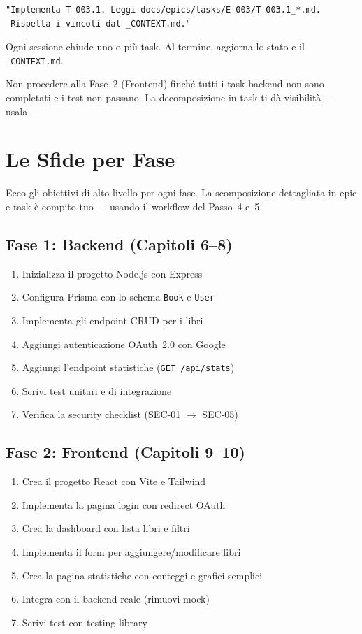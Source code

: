 \begin{lstlisting}[language={}]
"Implementa T-003.1. Leggi docs/epics/tasks/E-003/T-003.1_*.md.
 Rispetta i vincoli dal _CONTEXT.md."
\end{lstlisting}

Ogni sessione chiude uno o più task. Al termine, aggiorna lo stato e il \texttt{\_CONTEXT.md}.

\begin{tipbox}
Non procedere alla Fase~2 (Frontend) finché tutti i task backend non sono completati e i test non passano. La decomposizione in task ti dà visibilità --- usala.
\end{tipbox}

\section{Le Sfide per Fase}

Ecco gli obiettivi di alto livello per ogni fase. La scomposizione dettagliata in epic e task è compito tuo --- usando il workflow del Passo~4 e~5.

\subsection{Fase 1: Backend (Capitoli 6--8)}

\begin{enumerate}
  \item Inizializza il progetto Node.js con Express
  \item Configura Prisma con lo schema \texttt{Book} e \texttt{User}
  \item Implementa gli endpoint CRUD per i libri
  \item Aggiungi autenticazione OAuth~2.0 con Google
  \item Aggiungi l'endpoint statistiche (\texttt{GET /api/stats})
  \item Scrivi test unitari e di integrazione
  \item Verifica la security checklist (SEC-01 $\rightarrow$ SEC-05)
\end{enumerate}

\subsection{Fase 2: Frontend (Capitoli 9--10)}

\begin{enumerate}
  \item Crea il progetto React con Vite e Tailwind
  \item Implementa la pagina login con redirect OAuth
  \item Crea la dashboard con lista libri e filtri
  \item Implementa il form per aggiungere/modificare libri
  \item Crea la pagina statistiche con conteggi e grafici semplici
  \item Integra con il backend reale (rimuovi mock)
  \item Scrivi test con testing-library
\end{enumerate}


